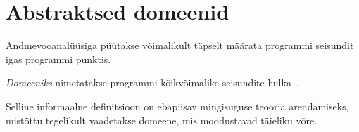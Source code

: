 \documentclass[../thesis.tex]{subfiles}
\begin{document}
\section{Abstraktsed domeenid}

Andmevooanalüüsiga püütakse võimalikult täpselt määrata programmi seisundit igas programmi punktis.

\begin{definition}
\emph{Domeeniks} nimetatakse programmi kõikvõimalike seisundite hulka~\cite{vojdani_magister}.
\end{definition}

Selline informaalne definitsioon on ebapiisav mingisuguse teooria arendamiseks, mistõttu tegelikult vaadetakse domeene, mis moodustavad täieliku võre.
\end{document}
